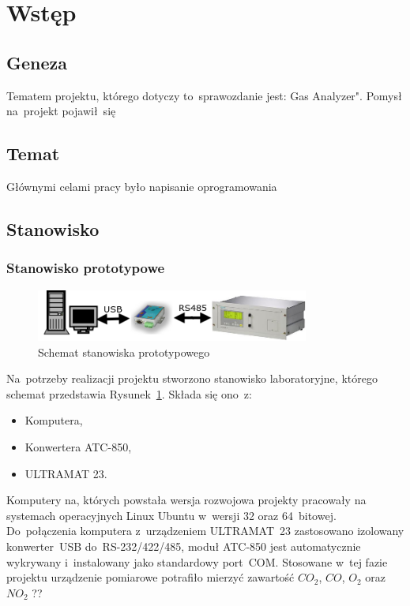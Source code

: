 \section{Wstęp}

\subsection{Geneza}
Tematem projektu, którego dotyczy to~sprawozdanie jest: Gas Analyzer". Pomysł na~projekt pojawił~się 

\subsection{Temat}
Głównymi celami pracy było napisanie oprogramowania

\subsection{Stanowisko}
\subsubsection{Stanowisko prototypowe}
\begin{figure}[!htb] 	\centering 	\includegraphics[width=0.8\textwidth]{images/schemat1} 	\caption{Schemat stanowiska prototypowego} \label{schemat1} \end{figure} 
Na~potrzeby realizacji projektu stworzono stanowisko laboratoryjne, którego schemat przedstawia Rysunek~\ref{schemat1}. Składa się ono~z:
\begin{itemize}
\item Komputera,
\item Konwertera ATC-850,
\item ULTRAMAT 23.
\end{itemize}
\indent
\indent Komputery na, których powstała wersja rozwojowa projekty pracowały na systemach operacyjnych Linux Ubuntu w~wersji 32 oraz 64~bitowej. Do~połączenia komputera z~urządzeniem ULTRAMAT~23 zastosowano izolowany konwerter~USB do~RS-232/422/485, moduł ATC-850 jest automatycznie wykrywany i~instalowany jako standardowy port~COM. Stosowane w~tej fazie projektu urządzenie pomiarowe potrafiło mierzyć zawartość $ CO_2 $, $ CO $, $ O_2 $ oraz $ NO_2 $ ??

